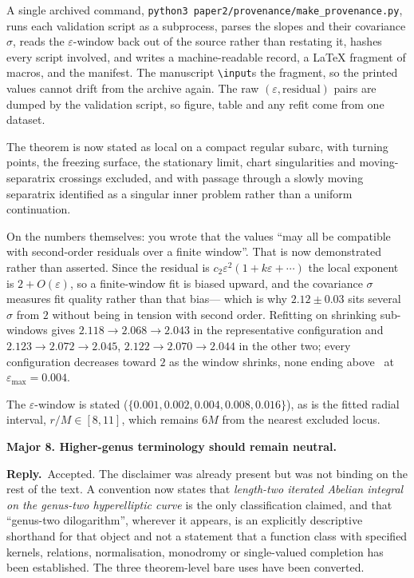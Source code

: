 \documentclass[11pt]{article}
\newcommand{\reply}{\par\noindent\textbf{Reply.}\ }
\newcommand{\R}[1]{\par\medskip\noindent\textbf{#1}\par\nopagebreak}
\begin{document}
A single archived command,
\texttt{python3 paper2/provenance/make\_provenance.py}, runs each validation
script as a subprocess, parses the slopes and their covariance $\sigma$, reads
the $\varepsilon$-window back out of the source rather than restating it, hashes
every script involved, and writes a machine-readable record, a \LaTeX{} fragment
of macros, and the manifest. The manuscript \texttt{\textbackslash input}s the
fragment, so the printed values cannot drift from the archive again. The raw
$(\varepsilon,\text{residual})$ pairs are dumped by the validation script, so
figure, table and any refit come from one dataset.

The theorem is now stated as local on a compact regular subarc, with turning
points, the freezing surface, the stationary limit, chart singularities and
moving-separatrix crossings excluded, and with passage through a slowly moving
separatrix identified as a singular inner problem rather than a uniform
continuation.

On the numbers themselves: you wrote that the values ``may all be compatible
with second-order residuals over a finite window''. That is now demonstrated
rather than asserted. Since the residual is $c_2\varepsilon^2(1+k\varepsilon+\cdots)$
the local exponent is $2+O(\varepsilon)$, so a finite-window fit is biased
upward, and the covariance $\sigma$ measures fit quality rather than that bias---%
which is why $2.12\pm0.03$ sits several $\sigma$ from $2$ without being in
tension with second order. Refitting on shrinking sub-windows gives
$2.118\to2.068\to2.043$ in the representative configuration and
$2.123\to2.072\to2.045$, $2.122\to2.070\to2.044$ in the other two; every
configuration decreases toward $2$ as the window shrinks, none ending above
\provSubwindowNarrowest\ at $\varepsilon_{\max}=0.004$.

The $\varepsilon$-window is stated ($\{0.001,0.002,0.004,0.008,0.016\}$), as is
the fitted radial interval, $r/M\in[8,11]$, which remains $6M$ from the nearest
excluded locus.

\R{Major 8. Higher-genus terminology should remain neutral.}

\reply Accepted. The disclaimer was already present but was not binding on the
rest of the text. A convention now states that \emph{length-two iterated Abelian
integral on the genus-two hyperelliptic curve} is the only classification
claimed, and that ``genus-two dilogarithm'', wherever it appears, is an
explicitly descriptive shorthand for that object and not a statement that a
function class with specified kernels, relations, normalisation, monodromy or
single-valued completion has been established. The three theorem-level bare uses
have been converted.
\end{document}
